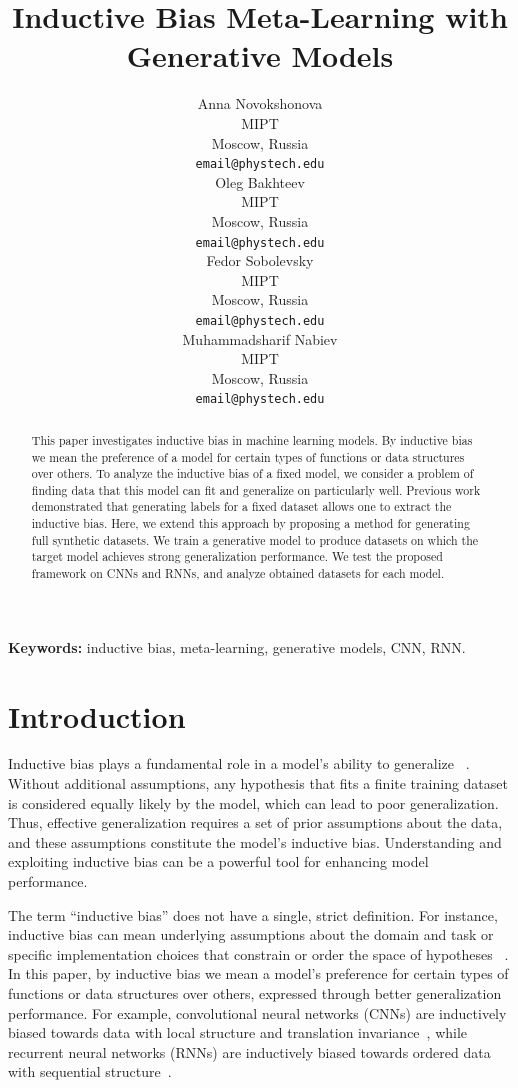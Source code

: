 \documentclass{article}
\title{Inductive Bias Meta-Learning with Generative Models}
\author{
  Anna Novokshonova\\
  MIPT\\
  Moscow, Russia\\
  \texttt{email@phystech.edu}\\
  \And
  Oleg Bakhteev\\
  MIPT\\
  Moscow, Russia\\
  \texttt{email@phystech.edu}\\
  \And
  Fedor Sobolevsky\\
  MIPT\\
  Moscow, Russia\\
  \texttt{email@phystech.edu}\\
  \And
  Muhammadsharif Nabiev\\
  MIPT\\
  Moscow, Russia\\
  \texttt{email@phystech.edu}\\
}
\begin{document}
\raggedbottom 


\maketitle

\begin{abstract}
    This paper investigates inductive bias in machine learning models. By inductive bias we mean the preference of a model for certain types of functions or data structures over others. To analyze the inductive bias of a fixed model, we consider a problem of finding data that this model can fit and generalize on particularly well. Previous work demonstrated that generating labels for a fixed dataset allows one to extract the inductive bias. Here, we extend this approach by proposing a method for generating full synthetic datasets. We train a generative model to produce datasets on which the target model achieves strong generalization performance. We test the proposed framework on CNNs and RNNs, and analyze obtained datasets for each model.
\end{abstract}

\textbf{Keywords:} inductive bias, meta-learning, generative models, CNN, RNN.

\section{Introduction}\label{sec:intro}

Inductive bias plays a fundamental role in a model’s ability to generalize ~\cite{mitchell1980need}. Without additional assumptions, any hypothesis that fits a finite training dataset is considered equally likely by the model, which can lead to poor generalization. Thus, effective generalization requires a set of prior assumptions about the data, and these assumptions constitute the model’s inductive bias. Understanding and exploiting inductive bias can be a powerful tool for enhancing model performance.

The term “inductive bias” does not have a single, strict definition. For instance, inductive bias can mean underlying assumptions about the domain and task or specific implementation choices that constrain or order the space of hypotheses ~\cite{provost1995inductive}. In this paper, by inductive bias we mean a model's preference for certain types of functions or data structures over others, expressed through better generalization performance. For example, convolutional neural networks (CNNs) are inductively biased towards data with local structure and translation invariance~\cite{726791, wang2024theoreticalanalysisinductivebiases, cohen2017inductivebiasdeepconvolutional}, while recurrent neural networks (RNNs) are inductively biased towards ordered data with sequential structure~\cite{lstm, ishii2023empiricalanalysisinductivebias,DUBININ2024106179}.
\end{document}
